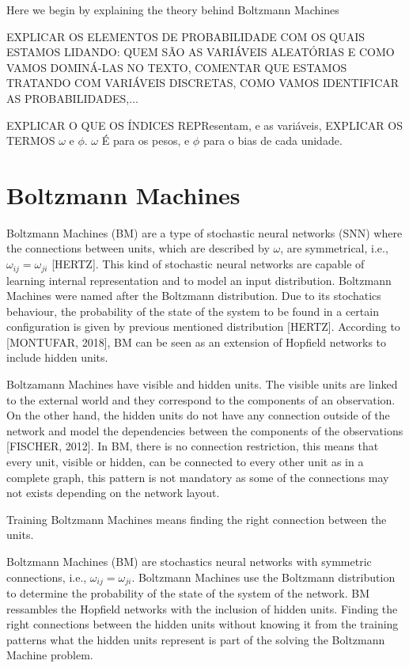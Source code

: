 Here we begin by explaining the theory behind Boltzmann Machines

EXPLICAR OS ELEMENTOS DE PROBABILIDADE COM OS QUAIS ESTAMOS LIDANDO:%
QUEM S\~{A}O AS VARI\'{A}VEIS ALEAT\'{O}RIAS E COMO VAMOS DOMIN\'{A}-LAS NO TEXTO, 
COMENTAR QUE ESTAMOS TRATANDO COM VARI\'{A}VEIS DISCRETAS, COMO VAMOS IDENTIFICAR AS PROBABILIDADES,$\ldots$

EXPLICAR O QUE OS \'{I}NDICES REPResentam, e as vari\'{a}veis,
EXPLICAR OS TERMOS $\omega$ e $\phi$. $\omega$ \'{E} para os pesos, e $\phi$ para o bias de cada unidade.


\section{Boltzmann Machines}

Boltzmann Machines (BM) are a type of stochastic neural networks (SNN) where the connections between units, which are described by $\omega$, are symmetrical, i.e., $\omega_{ij} = \omega_{ji}$ [HERTZ]. 
This kind of stochastic neural networks are capable of learning internal representation and to model an input distribution. 
Boltzmann Machines were named after the Boltzmann distribution. 
Due to its stochatics behaviour, the probability of the state of the system to be found in a certain configuration is given by previous mentioned distribution [HERTZ]. 
According to [MONTUFAR, 2018], BM can be seen as an extension of Hopfield networks to include hidden units.


Boltzamann Machines have visible and hidden units. 
The visible units are linked to the external world and they correspond to the components of an observation. On the other hand, the hidden units do not have any connection outside of the network and model the dependencies between the components of the observations [FISCHER, 2012]. 
In BM, there is no connection restriction, this means that every unit, visible or hidden, can be connected to every other unit as in a complete graph, this pattern is not mandatory as some of the connections may not exists depending on the network layout.

Training Boltzmann Machines means finding the right connection between the units.

Boltzmann Machines (BM) are stochastics neural networks with symmetric connections, i.e., $\omega_{ij} = \omega_{ji}$. 
Boltzmann Machines use the Boltzmann distribution to determine the probability of the state of the system of the network. 
BM ressambles the Hopfield networks with the inclusion of hidden units. 
Finding the right connections between the hidden units without knowing it from the training patterns what the hidden units represent is part of the solving the Boltzmann Machine problem.


